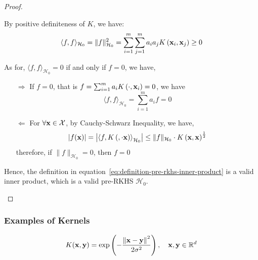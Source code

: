 \begin{proof}
\begin{enumerate}
\begin{enumerate}
			            By positive definiteness of \(K\), we have:
			            \begin{equation*}
				            \langle f,f\rangle_{\mathcal{H}_{0}}=\|f\|_{\mathcal{H}_{0}}^{2}=\sum_{i=1}^{m}\sum_{j=1}^{m}a_{i}a_{j}K\left(\mathbf{x}_{i},\mathbf{x}_{j}\right)\geq 0
			            \end{equation*}

			            As for, \(\langle f,f\rangle_{\mathcal{H}_{0}}=0\) if and only if \(f=0\), we have,
			            \begin{itemize}
				            \item[\(\Rightarrow\)] If \(f=0\), that is \(f=\sum_{i=1}^{m}a_{i}K\left(\cdot,\mathbf{x}_{i}\right)=0\), we have
				                  \begin{equation*}
					                  \langle f,f\rangle_{\mathcal{H}_{0}}=\sum_{i=1}^{m}a_{i}f=0
				                  \end{equation*}
				            \item[\(\Leftarrow\)] For \(\forall\mathbf{x}\in\mathcal{X}\), by Cauchy-Schwarz Inequality, we have,
				                  \begin{equation*}
					                  |f(\mathbf{x})|=\left|\left\langle f,K\left(,\cdot{\mathbf{x}}\right)\right\rangle_{\mathcal{H}_{0}}\right|\leq\|f\|_{\mathcal{H}_{0}}\cdot K\left(\mathbf{x},\mathbf{x}\right)^{\frac{1}{2}}
				                  \end{equation*}
				                  therefore, if \(\|f\|_{\mathcal{H}_{0}}=0\), then \(f=0\)
			            \end{itemize}
		      \end{enumerate}
		      Hence, the definition in equation~\eqref{eq:definition-pre-rkhs-inner-product} is a valid inner product, which is a valid pre-RKHS \(\mathcal{H}_{0}\).
	\end{enumerate}
\end{proof}

\subsubsection{Examples of Kernels}

\begin{example}
	\begin{equation}
		K(\mathbf{x},\mathbf{y})=\exp\left(-\frac{\left\|\mathbf{x}-\mathbf{y}\right\|^{2}}{2\sigma^{2}}\right),\quad\mathbf{x},\mathbf{y}\in\mathbb{R}^{d}
	\end{equation}
\end{example}


